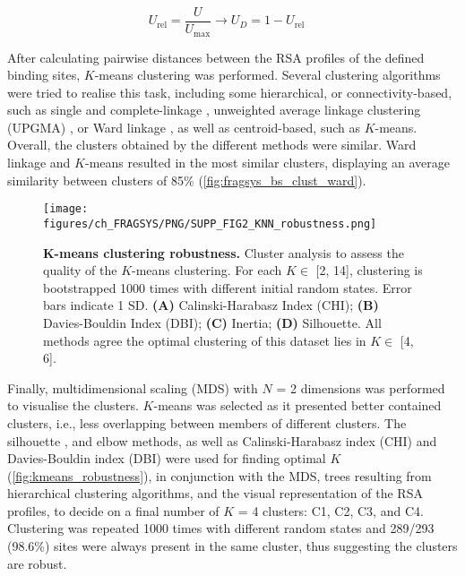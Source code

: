\begin{equation}
U_{\text{rel}} = \frac{U}{U_{\max}} \rightarrow U_D = 1 - U_{\text{rel}} \quad 
\label{eq:relative_U}
\end{equation}

\vspace{-12pt} %

After calculating pairwise distances between the RSA profiles of the defined binding sites, $K$-means clustering \cite{LLOYD_1982_KMEANS} was performed. Several clustering algorithms were tried to realise this task, including some hierarchical, or connectivity-based, such as single and complete-linkage \cite{SORENSEN_1948_CL}, unweighted average linkage clustering (UPGMA) \cite{SOKAL_1958_UPGMA}, or Ward linkage \cite{WARD_1963_CLUSTERING}, as well as centroid-based, such as $K$-means. Overall, the clusters obtained by the different methods were similar. Ward linkage and $K$-means resulted in the most similar clusters, displaying an average similarity between clusters of 85\% (\autoref{fig:fragsys_bs_clust_ward}).

\begin{figure}[ht!]
    \centering
    \texttt{[image: figures/ch\_FRAGSYS/PNG/SUPP\_FIG2\_KNN\_robustness.png]}
    \caption[$K$-means clustering robustness]{\textbf{K-means clustering robustness.} Cluster analysis to assess the quality of the $K$-means clustering. For each $K \in$ [2, 14], clustering is bootstrapped 1000 times with different initial random states. Error bars indicate 1 SD. \textbf{(A)} Calinski-Harabasz Index (CHI); \textbf{(B)} Davies-Bouldin Index (DBI); \textbf{(C)} Inertia; \textbf{(D)} Silhouette. All methods agree the optimal clustering of this dataset lies in $K \in$ [4, 6].}
    \label{fig:kmeans_robustness}
\end{figure}

Finally, multidimensional scaling (MDS) \cite{MEAD_1992_MDS} with $N$ = 2 dimensions was performed to visualise the clusters. $K$-means was selected as it presented better contained clusters, i.e., less overlapping between members of different clusters. The silhouette \cite{ROUSSEEUW_1987_SILHOUETTES}, and elbow \cite{THORNDIKE_1953_ELBOW} methods, as well as Calinski-Harabasz index (CHI) \cite{CALINSKI_1974_CHI} and Davies-Bouldin index (DBI) \cite{DAVIES_1979_DBI} were used for finding optimal $K$ (\autoref{fig:kmeans_robustness}), in conjunction with the MDS, trees resulting from hierarchical clustering algorithms, and the visual representation of the RSA profiles, to decide on a final number of $K$ = 4 clusters: C1, C2, C3, and C4. Clustering was repeated 1000 times with different random states and 289/293 (98.6\%) sites were always present in the same cluster, thus suggesting the clusters are robust.

